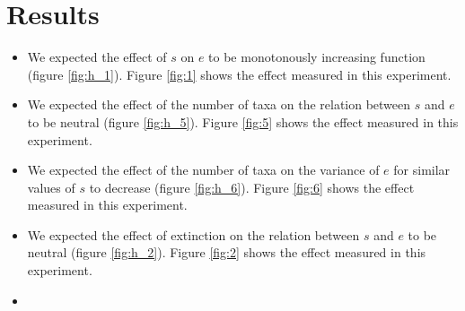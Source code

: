 \section{Results}
\begin{itemize}

\item We expected the effect of $s$ on $e$ to be monotonously increasing
function (figure \ref{fig:h_1}). Figure \ref{fig:1} shows the effect 
measured in this experiment. 



\item We expected the effect of the number of taxa on the relation
between $s$ and $e$ to be neutral (figure \ref{fig:h_5}). 
Figure \ref{fig:5} shows the effect 
measured in this experiment. 



\item We expected the effect of the number of taxa on the variance
of $e$ for similar values of $s$ to decrease (figure \ref{fig:h_6}). 
Figure \ref{fig:6} shows the effect 
measured in this experiment. 



\item We expected the effect of extinction on the relation
between $s$ and $e$ to be neutral (figure \ref{fig:h_2}). 
Figure \ref{fig:2} shows the effect 
measured in this experiment. 



\item

\end{itemize}